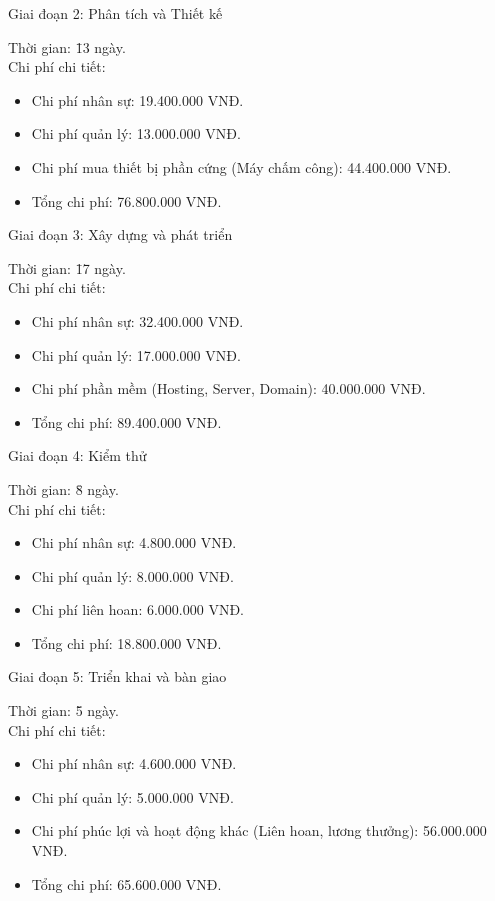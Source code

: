 Giai đoạn 2: Phân tích và Thiết kế
\begin{tabbing}
    Thời gian: \= 13 ngày. \\
    Chi phí chi tiết: %
\end{tabbing}
\begin{itemize}
    \item Chi phí nhân sự: 19.400.000 VNĐ.
    \item Chi phí quản lý: 13.000.000 VNĐ.
    \item Chi phí mua thiết bị phần cứng (Máy chấm công): 44.400.000 VNĐ.
    \item Tổng chi phí: 76.800.000 VNĐ.
\end{itemize}

Giai đoạn 3: Xây dựng và phát triển
\begin{tabbing}
    Thời gian: \= 17 ngày. \\
    Chi phí chi tiết: %
\end{tabbing}
\begin{itemize}
    \item Chi phí nhân sự: 32.400.000 VNĐ.
    \item Chi phí quản lý: 17.000.000 VNĐ.
    \item Chi phí phần mềm (Hosting, Server, Domain): 40.000.000 VNĐ.
    \item Tổng chi phí: 89.400.000 VNĐ.
\end{itemize}

Giai đoạn 4: Kiểm thử
\begin{tabbing}
    Thời gian: \= 8 ngày. \\
    Chi phí chi tiết: %
\end{tabbing}
\begin{itemize}
    \item Chi phí nhân sự: 4.800.000 VNĐ.
    \item Chi phí quản lý: 8.000.000 VNĐ.
    \item Chi phí liên hoan: 6.000.000 VNĐ.
    \item Tổng chi phí: 18.800.000 VNĐ.
\end{itemize}

Giai đoạn 5: Triển khai và bàn giao
\begin{tabbing}
    Thời gian: \= 5 ngày. \\
    Chi phí chi tiết: %
\end{tabbing}
\begin{itemize}
    \item Chi phí nhân sự: 4.600.000 VNĐ.
    \item Chi phí quản lý: 5.000.000 VNĐ.
    \item Chi phí phúc lợi và hoạt động khác (Liên hoan, lương thưởng): 56.000.000 VNĐ.
    \item Tổng chi phí: 65.600.000 VNĐ.
\end{itemize}


